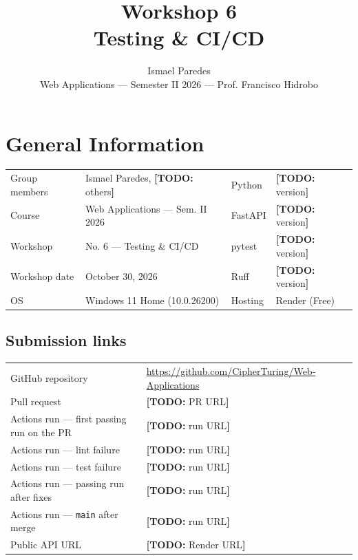 \documentclass[10pt,a4paper]{article}
\title{\vspace{-1.4cm}\textbf{Workshop 6}\\[0.2em]
\large Testing \& CI/CD}
\author{Ismael Paredes \todo{other group members}\\[0.1em]
\normalsize Web Applications --- Semester II 2026 --- Prof. Francisco Hidrobo}
\date{\todo{submission date}}
\newcommand{\todo}[1]{{\color{todored}\textbf{[TODO:} #1\textbf{]}}}
\begin{document}
\maketitle
\vspace{-0.8cm}

\section{General Information}

\begin{table}[H]
\centering
\footnotesize
\begin{tabular}{@{}ll@{\hspace{1.5cm}}ll@{}}
\toprule
Group members & Ismael Paredes, \todo{others} & Python & \todo{version} \\
Course & Web Applications --- Sem. II 2026 & FastAPI & \todo{version} \\
Workshop & No. 6 --- Testing \& CI/CD & pytest & \todo{version} \\
Workshop date & October 30, 2026 & Ruff & \todo{version} \\
OS & Windows 11 Home (10.0.26200) & Hosting & Render (Free) \\
\bottomrule
\end{tabular}
\end{table}

\subsection*{Submission links}

\begin{table}[H]
\centering
\footnotesize
\begin{tabularx}{\textwidth}{@{}lX@{}}
\toprule
GitHub repository & \url{https://github.com/CipherTuring/Web-Applications} \\
Pull request & \todo{PR URL} \\
Actions run --- first passing run on the PR & \todo{run URL} \\
Actions run --- lint failure & \todo{run URL} \\
Actions run --- test failure & \todo{run URL} \\
Actions run --- passing run after fixes & \todo{run URL} \\
Actions run --- \texttt{main} after merge & \todo{run URL} \\
Public API URL & \todo{Render URL} \\
\bottomrule
\end{tabularx}
\end{table}
\end{document}

